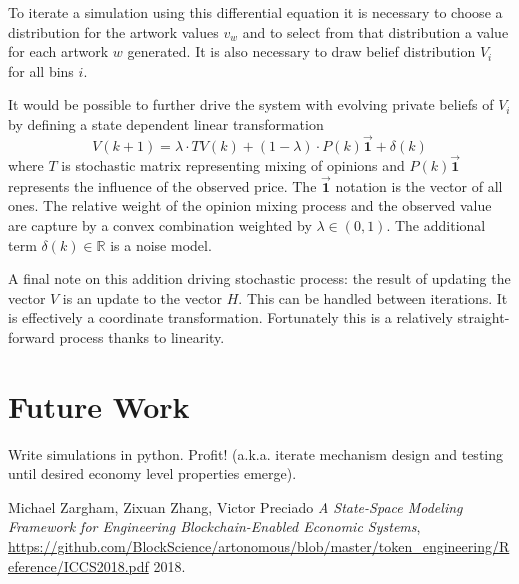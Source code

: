 \documentclass[11pt]{amsart}
\begin{document}
To iterate a simulation using this differential equation it is necessary to choose a distribution for the artwork values $v_w$ and to select from that distribution a value for each artwork $w$ generated.  It is also necessary to draw belief distribution $V_i$ for all bins $i$.  

It would be possible to further drive the system with evolving private beliefs of $V_i$ by defining a state dependent linear transformation
\begin{equation}
V(k+1) =  \lambda \cdot T V(k) + (1-\lambda) \cdot P(k) \vec{\mathbf{1}}  + \delta(k)
\end{equation}
where $T$ is stochastic matrix representing mixing of opinions and $P(k) \vec {\mathbf{1}}$ represents the influence of the observed price. The $\vec{\mathbf{1}}$ notation is the vector of all ones. The relative weight of the opinion mixing process and the observed value are capture by a convex combination weighted by $\lambda\in (0,1)$. The additional term $\delta(k)\in \mathbb{R}$ is a noise model.

A final note on this addition driving stochastic process: the result of updating the vector $V$ is an update to the vector $H$.  This can be handled between iterations. It is effectively a coordinate transformation. Fortunately this is a relatively straight-forward process thanks to linearity. 

\section{Future Work} 

Write simulations in python. Profit! (a.k.a. iterate mechanism design and testing until desired economy level properties emerge).

  \begin{thebibliography}{1}

   Michael Zargham, Zixuan Zhang, Victor Preciado {\em A State-Space Modeling Framework for Engineering Blockchain-Enabled Economic Systems}, \url{https://github.com/BlockScience/artonomous/blob/master/token_engineering/Reference/ICCS2018.pdf}  2018.

  \end{thebibliography}
\end{document}
